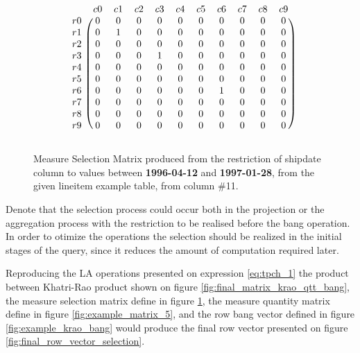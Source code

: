  \begin{figure}[H]
\centering
\caption{Measure Selection Matrix produced from the restriction of shipdate column to values between  \textbf{1996-04-12} and \textbf{1997-01-28}, from the given lineitem example table, from column \#11.}
\[
\begin{blockarray}{ccccccccccc}
		& c	0	& c	1	& c	2	& c	3	& c	4	& c	5	& c	6	& c	7	& c	8	& c	9	\\
\begin{block}{c(cccccccccc)}
r	0	&	0	&	0	&	0	&	0	&	0	&	0	&	0	&	0	&	0	&	0	\\
r	1	&	0	&	1	&	0	&	0	&	0	&	0	&	0	&	0	&	0	&	0	\\
r	2	&	0	&	0	&	0	&	0	&	0	&	0	&	0	&	0	&	0	&	0	\\
r	3	&	0	&	0	&	0	&	1	&	0	&	0	&	0	&	0	&	0	&	0	\\
r	4	&	0	&	0	&	0	&	0	&	0	&	0	&	0	&	0	&	0	&	0	\\
r	5	&	0	&	0	&	0	&	0	&	0	&	0	&	0	&	0	&	0	&	0	\\
r	6	&	0	&	0	&	0	&	0	&	0	&	0	&	1	&	0	&	0	&	0	\\
r	7	&	0	&	0	&	0	&	0	&	0	&	0	&	0	&	0	&	0	&	0	\\
r	8	&	0	&	0	&	0	&	0	&	0	&	0	&	0	&	0	&	0	&	0	\\
r	9	&	0	&	0	&	0	&	0	&	0	&	0	&	0	&	0	&	0	&	0	\\
\end{block}
\end{blockarray}
\]
\label{fig:example_restriction}
\end{figure}

Denote that the selection process could occur both in the projection or the aggregation process with the restriction to be realised before the  bang operation. In order to otimize the operations the selection should be realized in the initial stages of the query, since it reduces the amount of computation required later.\par 
 
Reproducing the LA operations presented on expression \ref{eq:tpch_1} the product between Khatri-Rao product shown on figure \ref{fig:final_matrix_krao_qtt_bang}, the measure selection matrix define in figure \ref{fig:example_restriction}, the measure quantity matrix define in figure \ref{fig:example_matrix_5}, and the row bang vector defined in figure \ref{fig:example_krao_bang} would produce the final row vector presented on figure \ref{fig:final_row_vector_selection}.

